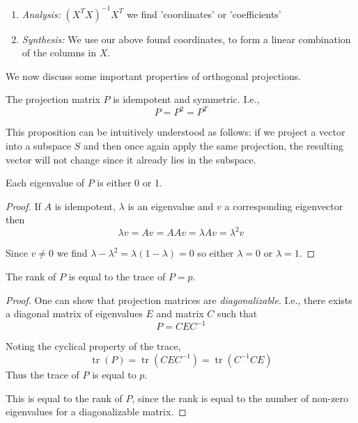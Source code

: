\documentclass[11pt, %
	oneside, %
	english, %
	onehalfspacing, %
	]{article} %
\numberwithin{equation}{section}
\begin{document}
\begin{enumerate}
    \item \emph{Analysis:} $\left(X^T X\right)^{-1} X^T$ we find 'coordinates' or 'coefficients'
    \item \emph{Synthesis:} We use our above found coordinates, to form a linear combination of the columns in $X$.
\end{enumerate}

We now discuss some important properties of orthogonal projections.

\begin{proposition}{}{}
    The projection matrix $P$ is idempotent and symmetric. I.e.,
    \begin{equation*}
        P = P^2 = P^T
    \end{equation*}
\end{proposition}

This proposition can be intuitively understood as follows: if we project a vector into a subspace $S$ and then once again apply the same projection, the resulting vector will not change since it already lies in the subspace.



\begin{proposition}{}{}
    Each eigenvalue of $P$ is either 0 or 1.
\end{proposition}

\begin{proof}
    If $A$ is idempotent, $\lambda$ is an eigenvalue and $v$ a corresponding eigenvector then
    $$
    \lambda v=A v=A A v=\lambda A v=\lambda^2 v
    $$

    Since $v \neq 0$ we find $\lambda-\lambda^2=\lambda(1-\lambda)=0$ so either $\lambda=0$ or $\lambda=1$.

\end{proof}

\begin{proposition}{}{}
    The rank of $P$ is equal to the trace of $P = p$.
\end{proposition}

\begin{proof}
    One can show that projection matrices are \emph{diagonalizable}. I.e., there exists a diagonal matrix of eigenvalues $E$ and matrix $C$ such that
    \begin{equation*}
        P = C E C^{-1}
    \end{equation*}

    Noting the cyclical property of the trace,
    \begin{equation*}
        \operatorname{tr}(P) = \operatorname{tr}(C E C^{-1}) = \operatorname{tr}(C^{-1} C E)
    \end{equation*}
    Thus the trace of $P$ is equal to $p$.

    This is equal to the rank of $P$, since the rank is equal to the number of non-zero eigenvalues for a diagonalizable matrix.
\end{proof}
\end{document}
